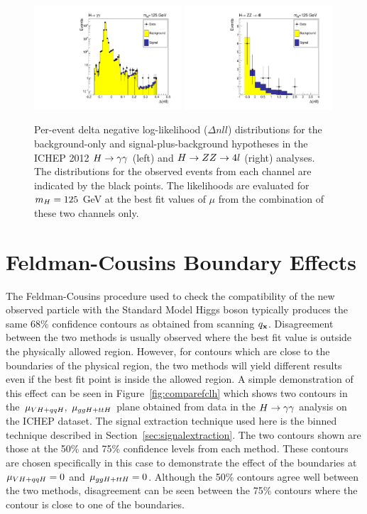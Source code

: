 \begin{figure}
\includegraphics[width=0.49\textwidth]{combinations/perEvLLR_hgg8TeV.pdf}
\includegraphics[width=0.49\textwidth]{combinations/perEvLLR_hZZ4l.pdf}
\caption{Per-event delta negative log-likelihood ($\Delta nll$) distributions for the 
background-only and signal-plus-background hypotheses in the ICHEP 2012 $H\rightarrow\gamma\gamma$ (left) and $H\rightarrow ZZ \rightarrow 4l$ (right)
analyses. The distributions for the observed events from each channel are indicated by the black points.
The likelihoods are evaluated for $m_{H}=125$ GeV at the best fit values of $\mu$ from the combination 
of these two channels only.}
\label{fig:perevllr}
\end{figure}



\section{Feldman-Cousins Boundary Effects}
\label{app:fcboundaryeffects}
The Feldman-Cousins procedure used to check the compatibility of the new observed
particle with the Standard Model Higgs boson typically produces the same 68\% confidence
contours as obtained from scanning $q_{\mathbf{x}}$. 
Disagreement between the two methods is usually observed where the best fit value
is outside the physically allowed region. However, for contours which are close to the
boundaries of the physical region, the two methods will yield different results even
if the best fit point is inside the allowed region.
A simple demonstration of this effect can be seen in Figure~\ref{fig:comparefclh}
which shows two contours in the $\mu_{VH+qqH},~\mu_{ggH+ttH}$ plane obtained from data
in the $H\rightarrow\gamma\gamma$  analysis on the ICHEP dataset. The signal extraction technique 
used here is the binned technique described in Section~\ref{sec:signalextraction}.
The two contours shown are those at the 50\% and 75\% confidence levels from each
method. These contours are chosen specifically in this case to demonstrate the effect
of the boundaries at $\mu_{VH+qqH}=0$ and $\mu_{ggH+ttH}=0$. Although the 50\% contours
agree well between the two methods, disagreement can be seen between the 75\% contours
where the contour is close to one of the boundaries.

